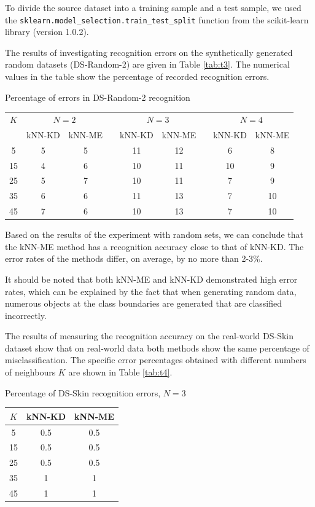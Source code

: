 \documentclass[entropy,article,submit,moreauthors,pdftex]{Definitions/mdpi}
\begin{document}
\begin{paracol}{2}
To divide the source dataset into a training sample and a test sample, we used the \texttt{sklearn.model\_selection.train\_test\_split} function from the scikit-learn library (version 1.0.2).

The results of investigating recognition errors on the synthetically generated random datasets (DS-Random-2) are given in Table \ref{tab:t3}. The numerical values in the table show the percentage of recorded recognition errors.

\begin{specialtable}[H] 
  \caption{Percentage of errors in DS-Random-2 recognition}\label{tab:t3}
	\center
	\begin{tabular}{ccccccccc}
\toprule
$K$ & \multicolumn{2}{c}{ $N=2$ } & & \multicolumn{2}{c}{$N=3$} & & \multicolumn{2}{c}{$N=4$} \\
		\noalign{\smallskip} \cline{2-3} \cline{5-6} \cline{8-9} \noalign{\smallskip}
  & kNN-KD & kNN-ME & & kNN-KD & kNN-ME & & kNN-KD & kNN-ME \\
\midrule													
5  & 5 & 5 & & 11 & 12 & & 6 & 8 \\
15 & 4 & 6 & & 10 & 11 & & 10 & 9 \\
25 & 5 & 7 & & 10 & 11 & & 7 & 9 \\
35 & 6 & 6 & & 11 & 13 & & 7 & 10 \\
45 & 7 & 6 & & 10 & 13 & & 7 & 10 \\
\bottomrule
\end{tabular}
\end{specialtable}

Based on the results of the experiment with random sets, we can conclude that the kNN-ME method has a recognition accuracy close to that of kNN-KD. The error rates of the methods differ, on average, by no more than 2-3\%.

It should be noted that both kNN-ME and kNN-KD demonstrated high error rates, which can be explained by the fact that when generating random data, numerous objects at the class boundaries are generated that are classified incorrectly.

The results of measuring the recognition accuracy on the real-world DS-Skin dataset show that on real-world data both methods show the same percentage of misclassification. The specific error percentages obtained with different numbers of neighbours $K$ are shown in Table \ref{tab:t4}.

\begin{specialtable}[H] 
  \caption{Percentage of DS-Skin recognition errors, $N=3$}\label{tab:t4}
	\center
\begin{tabular}{ccc}
\toprule
$K$ & kNN-KD & kNN-ME \\
\midrule													
5 & 0.5 & 0.5 \\
15 & 0.5 & 0.5 \\
25 & 0.5 & 0.5\\
35 & 1 & 1\\
45 & 1 & 1\\
\bottomrule
\end{tabular}
\end{specialtable}


\end{paracol}
\end{document}

